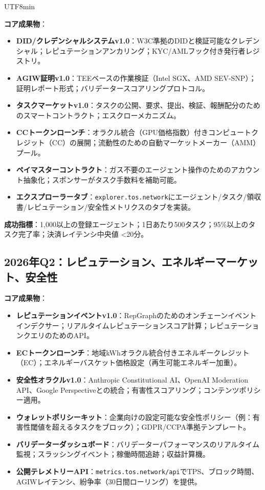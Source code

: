 \documentclass[11pt]{article}
\begin{document}
\begin{CJK}{UTF8}{min}
\begin{itemize}[noitemsep]
\textbf{コア成果物}：
\begin{itemize}[noitemsep]
  \item \textbf{DID/クレデンシャルシステムv1.0}：W3C準拠のDIDと検証可能なクレデンシャル；レピュテーションアンカリング；KYC/AMLフック付き発行者レジストリ。
  \item \textbf{AGIW証明v1.0}：TEEベースの作業検証（Intel SGX、AMD SEV-SNP）；証明レポート形式；バリデータースコアリングプロトコル。
  \item \textbf{タスクマーケットv1.0}：タスクの公開、要求、提出、検証、報酬配分のためのスマートコントラクト；エスクローメカニズム。
  \item \textbf{CCトークンローンチ}：オラクル統合（GPU価格指数）付きコンピュートクレジット（CC）の展開；流動性のための自動マーケットメーカー（AMM）プール。
  \item \textbf{ペイマスターコントラクト}：ガス不要のエージェント操作のためのアカウント抽象化；スポンサーがタスク手数料を補助可能。
  \item \textbf{エクスプローラータブ}：\texttt{explorer.tos.network}にエージェント/タスク/領収書/レピュテーション/安全性メトリクスのタブを実装。
\end{itemize}

\textbf{成功指標}：1,000以上の登録エージェント；1日あたり500タスク；95\%以上のタスク完了率；決済レイテンシ中央値 <20分。

\subsection{2026年Q2：レピュテーション、エネルギーマーケット、安全性}

\textbf{コア成果物}：
\begin{itemize}[noitemsep]
  \item \textbf{レピュテーションイベントv1.0}：RepGraphのためのオンチェーンイベントインデクサー；リアルタイムレピュテーションスコア計算；レピュテーションクエリのためのAPI。
  \item \textbf{ECトークンローンチ}：地域kWhオラクル統合付きエネルギークレジット（EC）；エネルギーバスケット価格設定（再生可能エネルギー加重）。
  \item \textbf{安全性オラクルv1.0}：Anthropic Constitutional AI、OpenAI Moderation API、Google Perspectiveとの統合；有害性スコアリング；コンテンツポリシー適用。
  \item \textbf{ウォレットポリシーキット}：企業向けの設定可能な安全性ポリシー（例：有害性閾値を超えるタスクをブロック）；GDPR/CCPA準拠テンプレート。
  \item \textbf{バリデーターダッシュボード}：バリデーターパフォーマンスのリアルタイム監視；スラッシングイベント；稼働時間追跡；収益計算機。
  \item \textbf{公開テレメトリーAPI}：\texttt{metrics.tos.network/api}でTPS、ブロック時間、AGIWレイテンシ、紛争率（30日間ローリング）を提供。
\end{itemize}


\end{itemize}
\end{CJK}
\end{document}
